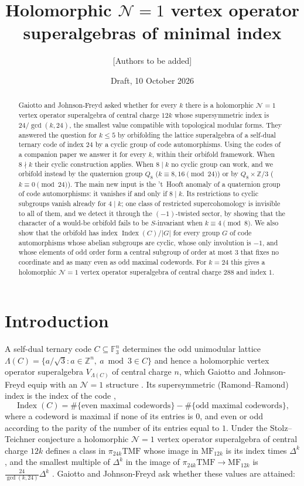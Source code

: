 \documentclass[11pt]{amsart}
\title{Holomorphic $\mathcal N=1$ vertex operator superalgebras of minimal index}
\author{[Authors to be added]}
\date{Draft, 10 October 2026}
\theoremstyle{definition}
\newcommand{\F}{\mathbb{F}_3}
\newcommand{\Z}{\mathbb{Z}}
\newcommand{\cN}{\mathcal N}
\newcommand{\Index}{\operatorname{Index}}
\begin{document}
\begin{abstract}
Gaiotto and Johnson-Freyd asked whether for every $k$ there is a holomorphic $\cN=1$ vertex operator
superalgebra of central charge $12k$ whose supersymmetric index is $24/\gcd(k,24)$, the smallest value
compatible with topological modular forms. They answered the question for $k\le5$ by orbifolding the
lattice superalgebra of a self-dual ternary code of index $24$ by a cyclic group of code automorphisms.
Using the codes of a companion paper we answer it for every $k$, within their orbifold framework.
When $8\nmid k$ their cyclic construction applies. When $8\mid k$ no cyclic group can work, and we
orbifold instead by the quaternion group $Q_8$ ($k\equiv8,16\pmod{24}$) or by $Q_8\times\Z/3$
($k\equiv0\pmod{24}$). The main new input is the 't~Hooft anomaly of a quaternion group of code
automorphisms: it vanishes if and only if $8\mid k$. Its restrictions to cyclic subgroups vanish already
for $4\mid k$; one class of restricted supercohomology is invisible to all of them, and we detect it
through the $(-1)$-twisted sector, by showing that the character of a would-be orbifold fails to be
$S$-invariant when $k\equiv4\pmod8$. We also show that the orbifold has index $\Index(C)/|G|$ for every
group $G$ of code automorphisms whose abelian subgroups are cyclic, whose only involution is $-1$, and
whose elements of odd order form a central subgroup of order at most $3$ that fixes no coordinate and as
many even as odd maximal codewords. For $k=24$ this gives a holomorphic
$\cN=1$ vertex operator superalgebra of central charge $288$ and index $1$.
\end{abstract}

\maketitle

\section{Introduction}\label{sec:intro}

A self-dual ternary code $C\subseteq\F^n$ determines the odd unimodular lattice
$\Lambda(C)=\{a/\sqrt3: a\in\Z^n,\ a\bmod3\in C\}$ and hence a holomorphic vertex operator
superalgebra $V_{\Lambda(C)}$ of central charge $n$, which Gaiotto and Johnson-Freyd equip with an
$\cN=1$ structure \cite[\S2]{GJF}. Its supersymmetric (Ramond--Ramond) index is the index of the code
\cite[Prop.~2.4]{GJF},
\[
  \Index(C)=\#\{\text{even maximal codewords}\}-\#\{\text{odd maximal codewords}\},
\]
where a codeword is maximal if none of its entries is $0$, and even or odd according to the parity of
the number of its entries equal to $1$. Under the Stolz--Teichner conjecture a holomorphic $\cN=1$
vertex operator superalgebra of central charge $12k$ defines a class in $\pi_{24k}\mathrm{TMF}$ whose
image in $\mathrm{MF}_{12k}$ is its index times $\Delta^k$ \cite[\S5]{GJF}, and the smallest multiple
of $\Delta^k$ in the image of $\pi_{24k}\mathrm{TMF}\to\mathrm{MF}_{12k}$ is
$\frac{24}{\gcd(k,24)}\Delta^k$ \cite[Prop.~4.6]{Hopkins}. Gaiotto and Johnson-Freyd ask whether these
values are attained:
\end{document}

